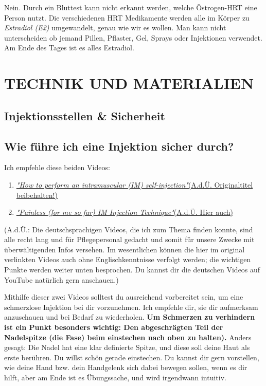 \documentclass{article}
\begin{document}
Nein. Durch ein Bluttest kann nicht erkannt werden, welche Östrogen-HRT eine Person nutzt. Die verschiedenen HRT Medikamente werden alle im Körper zu \textit{Estradiol (E2)} umgewandelt, genau wie wir es wollen. Man kann nicht unterscheiden ob jemand Pillen, Pflaster, Gel, Sprays oder Injektionen verwendet. Am Ende des Tages ist es alles Estradiol.

 

\section{TECHNIK UND MATERIALIEN} \label{ts}

\subsection*{Injektionsstellen \& Sicherheit}

\subsection{Wie führe ich eine Injektion sicher durch?}

Ich empfehle diese beiden Videos:

\begin{enumerate}
  \item \href{https://www.youtube.com/watch?v=cBabaGC2Dok}{\textit{"How to perform an intramuscular (IM) self-injection"}(A.d.Ü. Originaltitel beibehalten!)}
  \item \href{https://www.youtube.com/watch?v=YfNlAZLxLyw}{\textit{"Painless (for me so far) IM Injection Technique"}(A.d.Ü. Hier auch)}
\end{enumerate}

(A.d.Ü.: Die deutschsprachigen Videos, die ich zum Thema finden konnte, sind alle recht lang und für Pflegepersonal gedacht und somit für unsere Zwecke mit überwältigenden Infos versehen. Im wesentlichen können die hier im original verlinkten Videos auch ohne Englischkenntnisse verfolgt werden; die wichtigen Punkte werden weiter unten besprochen. Du kannst dir die deutschen Videos auf YouTube natürlich gern anschauen.) 

Mithilfe dieser zwei Videos solltest du ausreichend vorbereitet sein, um eine schmerzlose Injektion bei dir vorzunehmen. Ich empfehle dir, sie dir aufmerksam anzuschauen und bei Bedarf zu wiederholen. \textbf{Um Schmerzen zu verhindern ist ein Punkt besonders wichtig: Den abgeschrägten Teil der Nadelspitze (die Fase) beim einstechen nach oben zu halten).} Anders gesagt: Die Nadel hat eine klar definierte Spitze, und diese soll deine Haut als erste berühren. Du willst schön gerade einstechen. Du kannst dir gern vorstellen, wie deine Hand bzw. dein Handgelenk sich dabei bewegen sollen, wenn es dir hilft, aber am Ende ist es Übungssache, und wird irgendwann intuitiv.
\end{document}
